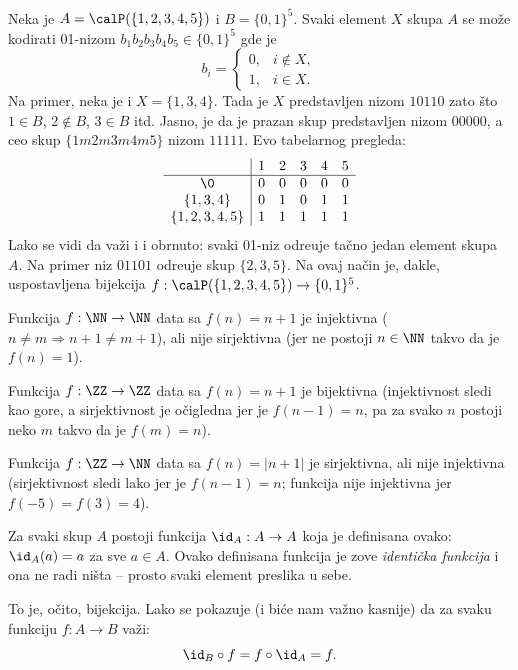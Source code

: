 \begin{EX}
  Neka je $A = \calP(\{1, 2, 3, 4, 5\})$ i $B = \{0,1\}^5$.
  Svaki element $X$ skupa $A$ se mo\v ze kodirati 01-nizom $b_1 b_2 b_3 b_4 b_5 \in \{0, 1\}^5$
  gde je
  $$
    b_i = \begin{cases}
      0, & i \notin X,\\
      1, & i \in X.
    \end{cases}
  $$
  Na primer, neka je  i $X = \{1, 3, 4\}$. Tada je $X$ predstavljen nizom $10110$
  zato \v sto $1 \in B$, $2 \notin B$, $3 \in B$ itd. Jasno, je da je prazan skup predstavljen nizom $00000$,
  a ceo skup $\{1m 2m 3m 4m 5\}$ nizom $11111$. Evo tabelarnog pregleda:
  $$
    \begin{array}{c|ccccc}
                        & 1 & 2 & 3 & 4 & 5 \\ \hline
      \0                & 0 & 0 & 0 & 0 & 0 \\
      \{1, 3, 4\}       & 0 & 1 & 0 & 1 & 1 \\
      \{1, 2, 3, 4, 5\} & 1 & 1 & 1 & 1 & 1 
    \end{array}
  $$
  Lako se vidi da va\v zi i i obrnuto: svaki 01-niz odre\dj uje ta\v cno jedan element skupa $A$. Na primer
  niz $01101$ odre\dj uje skup $\{2, 3, 5\}$. Na ovaj na\v cin je, dakle, uspostavljena bijekcija
  $f : \calP(\{1, 2, 3, 4, 5\}) \to \{0,1\}^5$.
\end{EX}

\begin{EX}
  Funkcija $f : \NN \to \NN$ data sa $f(n) = n + 1$ je injektivna ($n \ne m \Rightarrow n + 1 \ne m + 1$),
  ali nije sirjektivna (jer ne postoji $n \in \NN$ takvo da je $f(n) = 1$).

  Funkcija $f : \ZZ \to \ZZ$ data sa $f(n) = n + 1$ je bijektivna (injektivnost sledi kao gore, a sirjektivnost je o\v cigledna
  jer je $f(n - 1) = n$, pa za svako $n$ postoji neko $m$ takvo da je $f(m) = n$).

  Funkcija $f : \ZZ \to \NN$ data sa $f(n) = |n + 1|$ je sirjektivna, ali nije injektivna
  (sirjektivnost sledi lako jer je $f(n - 1) = n$; funkcija nije injektivna jer $f(-5) = f(3) = 4$).
\end{EX}

\begin{EX}\label{ft08.ex.id-A}
  Za svaki skup $A$ postoji funkcija $\id_A : A \to A$ koja je definisana ovako: $\id_A(a) = a$ za sve $a \in A$.
  Ovako definisana funkcija je zove \emph{identi\v cka funkcija} i ona ne radi ni\v sta -- prosto svaki element preslika u sebe.
  \begin{center}
    
  \end{center}
  To je, o\v cito, bijekcija. Lako se pokazuje (i bi\'ce nam va\v zno kasnije) da za svaku funkciju $f : A \to B$ va\v zi:
  $$
    \id_B \circ f = f \circ \id_A = f.
  $$
\end{EX}

